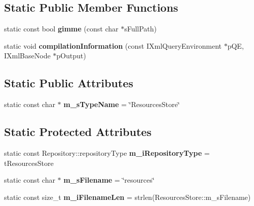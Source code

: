 \subsection*{\-Static \-Public \-Member \-Functions}
\begin{DoxyCompactItemize}
\item 
\hypertarget{classgeneral__server_1_1ResourcesStore_a3892349aaa58235777b9cd65db18b5f5}{static const bool {\bfseries gimme} (const char $\ast$s\-Full\-Path)}\label{classgeneral__server_1_1ResourcesStore_a3892349aaa58235777b9cd65db18b5f5}

\item 
\hypertarget{classgeneral__server_1_1ResourcesStore_a9423fae2ad060281fd11a29c49b88934}{static void {\bfseries compilation\-Information} (const \-I\-Xml\-Query\-Environment $\ast$p\-Q\-E, \-I\-Xml\-Base\-Node $\ast$p\-Output)}\label{classgeneral__server_1_1ResourcesStore_a9423fae2ad060281fd11a29c49b88934}

\end{DoxyCompactItemize}
\subsection*{\-Static \-Public \-Attributes}
\begin{DoxyCompactItemize}
\item 
\hypertarget{classgeneral__server_1_1ResourcesStore_a67c1e24fcdcbcbba403edee3d8a1419c}{static const char $\ast$ {\bfseries m\-\_\-s\-Type\-Name} = \char`\"{}\-Resources\-Store\char`\"{}}\label{classgeneral__server_1_1ResourcesStore_a67c1e24fcdcbcbba403edee3d8a1419c}

\end{DoxyCompactItemize}
\subsection*{\-Static \-Protected \-Attributes}
\begin{DoxyCompactItemize}
\item 
\hypertarget{classgeneral__server_1_1ResourcesStore_a5d529dfd971aab5b4b1893ca38ce0a16}{static const \*
\-Repository\-::repository\-Type {\bfseries m\-\_\-i\-Repository\-Type} = t\-Resources\-Store}\label{classgeneral__server_1_1ResourcesStore_a5d529dfd971aab5b4b1893ca38ce0a16}

\item 
\hypertarget{classgeneral__server_1_1ResourcesStore_a2adf76f0981af4c28bb8f4c405ead77c}{static const char $\ast$ {\bfseries m\-\_\-s\-Filename} = \char`\"{}resources\char`\"{}}\label{classgeneral__server_1_1ResourcesStore_a2adf76f0981af4c28bb8f4c405ead77c}

\item 
\hypertarget{classgeneral__server_1_1ResourcesStore_af4eb669f148c281ba6dffb599219f03b}{static const size\-\_\-t {\bfseries m\-\_\-i\-Filename\-Len} = strlen(\-Resources\-Store\-::m\-\_\-s\-Filename)}\label{classgeneral__server_1_1ResourcesStore_af4eb669f148c281ba6dffb599219f03b}

\end{DoxyCompactItemize}
